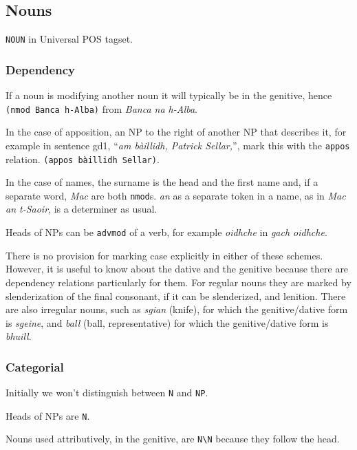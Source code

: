 \documentclass[a4paper]{article}
\begin{document}
\subsection{Nouns\label{subsect:nouns}}

\texttt{NOUN} in Universal POS tagset.

\subsubsection*{Dependency}
 If a noun is modifying another noun it will typically be in the genitive, hence \texttt{(nmod Banca h-Alba)} from \textit{Banca na h-Alba}.

 In the case of apposition, an NP to the right of another NP that describes it, for example in sentence gd1, ``\textit{am b\`aillidh, Patrick Sellar,}'', mark this with the \texttt{appos} relation. \texttt{(appos b\`aillidh Sellar)}. 

 In the case of names, the surname is the head and the first name and, if a separate word, \textit{Mac} are both \texttt{nmod}s. \textit{an} as a separate token in a name, as in \textit{Mac an t-Saoir}, is a determiner as usual.

 Heads of NPs can be \texttt{advmod} of a verb, for example \textit{oidhche} in \textit{gach oidhche}.

There is no provision for marking case explicitly in either of these schemes.
However, it is useful to know about the dative and the genitive because there are dependency relations particularly for them.
For regular nouns they are marked by slenderization of the final consonant, if it can be slenderized, and lenition.
There are also irregular nouns, such as \textit{sgian} (knife), for which the genitive/dative form is \textit{sgeine}, and \textit{ball} (ball, representative) for which the genitive/dative form is \textit{bhuill}.

\subsubsection*{Categorial}

Initially we won't distinguish between \texttt{N} and \texttt{NP}.

 Heads of NPs are \texttt{N}.

 Nouns used attributively, in the genitive, are \texttt{N\textbackslash N} because they follow the head.
\end{document}
